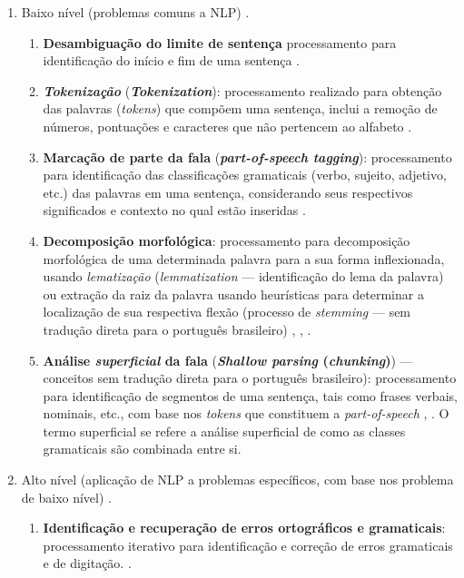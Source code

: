 \documentclass[
	12pt,				%
	oneside,			%
	a4paper,			%
	english,			%
	brazil				%
	]{abntex2ppgsi}
\begin{document}
{\begin{enumerate}
\item Baixo nível (problemas comuns a NLP) \cite{nadkarni2011natural}. 
\begin{enumerate}
\item \textbf{Desambiguação do limite de sentença}  processamento para identificação do início e fim de uma sentença \cite{nadkarni2011natural}. 
\item \textbf{\textit{Tokenização}} (\textit{\textbf{Tokenization}}): processamento realizado para obtenção das palavras  (\textit{tokens}) que compõem uma sentença, inclui a remoção de números, pontuações e caracteres que não pertencem ao alfabeto \cite{Setiawan2017}.
\item \textbf{Marcação de parte da fala} (\textbf{\textit{part-of-speech tagging}}): processamento para identificação das classificações gramaticais (verbo, sujeito, adjetivo, etc.) das palavras em uma  sentença, considerando seus respectivos significados e contexto no qual estão inseridas \cite{roy2017understanding}.
\item \textbf{Decomposição morfológica}: processamento para decomposição morfológica de uma determinada palavra para a sua forma inflexionada, usando \textit{lematização} (\textit{lemmatization} --- identificação do lema da palavra) ou  extração da raiz da palavra usando heurísticas para determinar a localização de sua respectiva flexão (processo de \textit{stemming} --- sem tradução direta para o português brasileiro) \cite{Setiawan2017}, \cite{nadkarni2011natural}, \cite{Korenius}.
\item \textbf{Análise \textit{superficial} da fala} (\textbf{\textit{Shallow parsing} (\textit{chunking})}) --- conceitos sem tradução direta para o português brasileiro): processamento para identificação de segmentos de uma sentença, tais como frases verbais, nominais, etc., com base nos \textit{tokens} que constituem a \textit{part-of-speech} \cite{collobert2011natural}, \cite{nadkarni2011natural}. O termo superficial se refere a análise superficial de como as classes gramaticais são combinada entre si. 
\end{enumerate}
\item Alto nível (aplicação de NLP a problemas específicos, com base nos problema de baixo nível) \cite{nadkarni2011natural}.
\begin{enumerate}
\item \textbf{Identificação e recuperação de erros ortográficos e gramaticais}: processamento iterativo para identificação e correção de erros gramaticais e de digitação. \cite{nadkarni2011natural}.

\end{enumerate}
\end{enumerate}}
\end{document}
